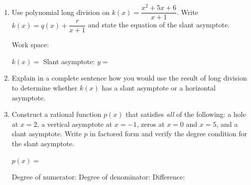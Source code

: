\documentclass[10pt]{article}
\begin{document}
\begin{tcolorbox}[colback=white, colframe=black!40,
    title=\textbf{Tier E --- Extend},
    fonttitle=\bfseries, arc=2mm, left=3mm, right=3mm, top=2mm, bottom=2mm]

\begin{enumerate}[itemsep=10pt]
  \item Use polynomial long division on $k(x) = \dfrac{x^2 + 5x + 6}{x+1}$.
        Write $k(x) = q(x) + \dfrac{r}{x+1}$ and state the equation of the slant asymptote.

        \vspace{0.06in}
        Work space:

        \vspace{0.5in}

        $k(x) = $ \blank{7cm} \quad Slant asymptote: $y = $ \blank{3cm}

  \item Explain in a complete sentence how you would use the result of long division to determine
        whether $k(x)$ has a slant asymptote or a horizontal asymptote.

        \vspace{0.06in}

  \item Construct a rational function $p(x)$ that satisfies \textit{all} of the following:
        a hole at $x = 2$, a vertical asymptote at $x = -1$, zeros at $x = 0$ and $x = 5$,
        and a slant asymptote. Write $p$ in factored form and verify the degree condition for the
        slant asymptote.

        \vspace{0.06in}
        $p(x) = $ \blank{9cm}

        \vspace{0.04in}
        Degree of numerator: \blank{1.5cm} \quad Degree of denominator: \blank{1.5cm} \quad Difference: \blank{1cm}
\end{enumerate}
\end{tcolorbox}
\end{document}
